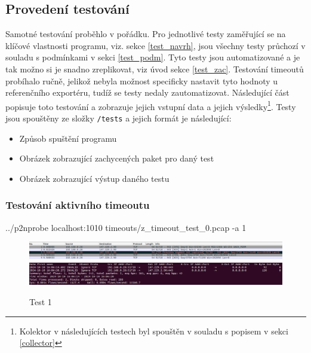 \documentclass[11pt, a4paper, hidelinks]{article}[08.10.2023]
\begin{document}
    \subsection{Provedení testování}
    Samotné testování proběhlo v pořádku. Pro jednotlivé testy zaměřující se na klíčové vlastnosti programu, viz. sekce  \ref{test_navrh}, jsou všechny testy průchozí v souladu s podmínkami v sekci \ref{test_podm}. Tyto testy jsou automatizované a  je tak možno si je snadno zreplikovat, viz úvod sekce \ref{test_zac}. Testování timeoutů probíhalo ručně, jelikož nebyla možnost specificky nastavit tyto hodnoty u referenčního exportéru, tudíž se testy nedaly zautomatizovat. Následující část popisuje toto testování a zobrazuje jejich vstupní data a jejich výsledky\footnote{Kolektor v následujících testech byl spouštěn v souladu s popisem v sekci \ref{collector}}. Testy jsou spouštěny ze složky \texttt{/tests} a jejich formát je následující: 
    \begin{itemize}
        \item{Způsob spuštění programu}
        \item{Obrázek zobrazující zachycených paket pro daný test}
        \item{Obrázek zobrazující výstup daného testu}
    \end{itemize}

    \subsubsection{Testování aktivního timeoutu}

    \begin{center}
        ../p2nprobe localhost:1010 timeouts/z\_timeout\_test\_0.pcap -a 1
    \end{center}
    \vspace{1cm}
    \begin{figure}[H]
        \centering
        \includegraphics[width=1\linewidth]{pictures/test_1_data.png}
        \includegraphics[width=1\linewidth]{pictures/test_1_res.png}
        \caption{Test 1}
    \end{figure}
\end{document}
